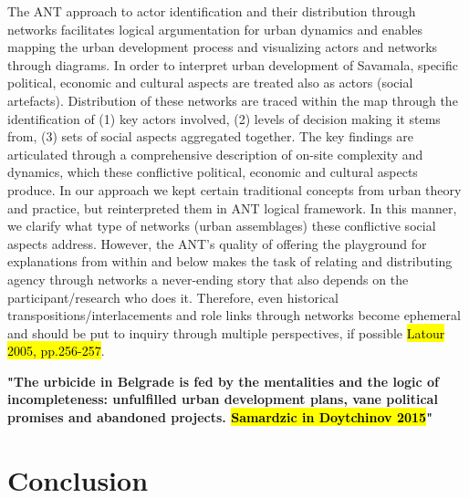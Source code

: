 \documentclass[11pt]{report}
\begin{document}
The ANT approach to actor identification and their distribution through networks facilitates logical argumentation for urban dynamics and enables mapping the urban development process and visualizing actors and networks through diagrams. In order to interpret urban development of Savamala, specific political, economic and cultural aspects are treated also as actors (social artefacts). Distribution of these networks are traced within the map through the identification of (1)  key actors involved, (2) levels of decision making it stems from, (3) sets of social aspects aggregated together. The key findings are articulated through a comprehensive description of on-site complexity and dynamics, which these conflictive political, economic and cultural aspects produce. In our approach we kept certain traditional concepts from urban theory and practice, but reinterpreted them in ANT logical framework. In this manner, we clarify what type of networks (urban assemblages) these conflictive social aspects address. However, the ANT's quality of offering the playground for explanations from within and below makes the task of relating and distributing agency through networks a never-ending story that also depends on the participant/research who does it. Therefore, even historical transpositions/interlacements and role links through networks become ephemeral and should be put to inquiry through multiple perspectives, if possible \hl{Latour 2005, pp.256-257}.

\textbf{"The  urbicide  in  Belgrade  is  fed  by  the  mentalities and  the  logic  of  incompleteness:  unfulfilled  urban development  plans,  vane  political  promises  and abandoned  projects. \hl{Samardzic in Doytchinov 2015}"}

\section{Conclusion}
\end{document}
